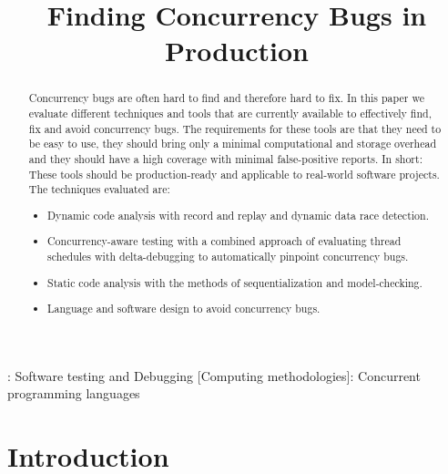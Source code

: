 \documentclass[conference]{IEEEtran}
\begin{document}
\title{Finding Concurrency Bugs in Production}

\author{
}

\maketitle

\begin{abstract}
Concurrency bugs are often hard to find and therefore hard to fix.
In this paper we evaluate different techniques and tools that are currently available to effectively find, fix and avoid concurrency bugs.
The requirements for these tools are that they need to be easy to use, they should bring only a minimal computational and storage overhead and they should have a high coverage with minimal false-positive reports.
In short: These tools should be production-ready and applicable to real-world software projects.
The techniques evaluated are:
\begin{itemize}
    \item Dynamic code analysis with record and replay and dynamic data race detection.
    \item Concurrency-aware testing with a combined approach of evaluating thread schedules with delta-debugging to automatically pinpoint concurrency bugs.
    \item Static code analysis with the methods of sequentialization and model-checking.
    \item Language and software design to avoid concurrency bugs.
\end{itemize}
\end{abstract}

\begin{IEEEkeywords}
    : Software testing and Debugging
    [Computing methodologies]: Concurrent programming languages
\end{IEEEkeywords}


\section{Introduction}
\end{document}
